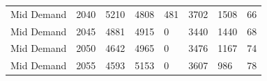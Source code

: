 \documentclass[preprint,12pt]{elsarticle}
\begin{document}
\begin{table}[h]
\begin{tabular}{llllllll}
    Mid Demand                            & 2040                              & 5210                                                                                             & 4808                                                                                             & 481                                                                                                & 3702                                                                                                               & 1508                                                                                                          & 66                                                                                            \\
    Mid Demand                            & 2045                              & 4881                                                                                             & 4915                                                                                             & 0                                                                                                  & 3440                                                                                                               & 1440                                                                                                          & 68                                                                                            \\
    Mid Demand                            & 2050                              & 4642                                                                                             & 4965                                                                                             & 0                                                                                                  & 3476                                                                                                               & 1167                                                                                                          & 74                                                                                            \\
    Mid Demand                            & 2055                              & 4593                                                                                             & 5153                                                                                             & 0                                                                                                  & 3607                                                                                                               & 986                                                                                                           & 78                                                                                            \\

\end{tabular}
\end{table}
\end{document}
